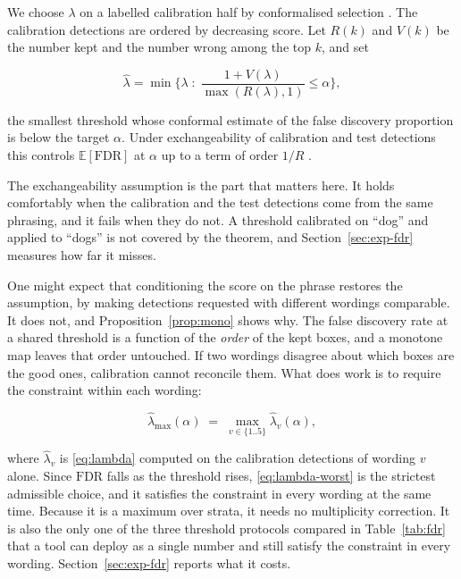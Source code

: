 We choose $\lambda$ on a labelled calibration half by conformalised selection
\citep{jin2023selection}. The calibration detections are ordered by decreasing score. Let $R(k)$
and $V(k)$ be the number kept and the number wrong among the top $k$, and set

\begin{equation}\label{eq:lambda}
\hat\lambda = \min\Big\{\lambda \;:\; \frac{1+V(\lambda)}{\max(R(\lambda),1)} \leq \alpha\Big\},
\end{equation}

the smallest threshold whose conformal estimate of the false discovery proportion is below the
target $\alpha$. Under exchangeability of calibration and test detections this controls
$\mathbb{E}[\mathrm{FDR}]$ at $\alpha$ up to a term of order $1/R$
\citep{jin2023selection,angelopoulos2023conformal}.

The exchangeability assumption is the part that matters here. It holds comfortably when the
calibration and the test detections come from the same phrasing, and it fails when they do not.
A threshold calibrated on ``dog'' and applied to ``dogs'' is not covered by the theorem, and
Section~\ref{sec:exp-fdr} measures how far it misses.

One might expect that conditioning the score on the phrase restores the assumption, by making
detections requested with different wordings comparable. It does not, and
Proposition~\ref{prop:mono} shows why. The false discovery rate at a shared threshold is a
function of the \emph{order} of the kept boxes, and a monotone map leaves that order untouched.
If two wordings disagree about which boxes are the good ones, calibration cannot reconcile
them. What does work is to require the constraint within each wording:

\begin{equation}\label{eq:lambda-worst}
\hat\lambda_{\max}(\alpha) \;=\; \max_{v\in\{1..5\}} \hat\lambda_v(\alpha),
\end{equation}

where $\hat\lambda_v$ is \eqref{eq:lambda} computed on the calibration detections of wording $v$
alone. Since $\mathrm{FDR}$ falls as the threshold rises, \eqref{eq:lambda-worst} is the
strictest admissible choice, and it satisfies the constraint in every wording at the same time.
Because it is a maximum over strata, it needs no multiplicity correction. It is also the only one
of the three threshold protocols compared in Table~\ref{tab:fdr} that a tool can deploy as a
single number and still satisfy the constraint in every wording. Section~\ref{sec:exp-fdr}
reports what it costs.

